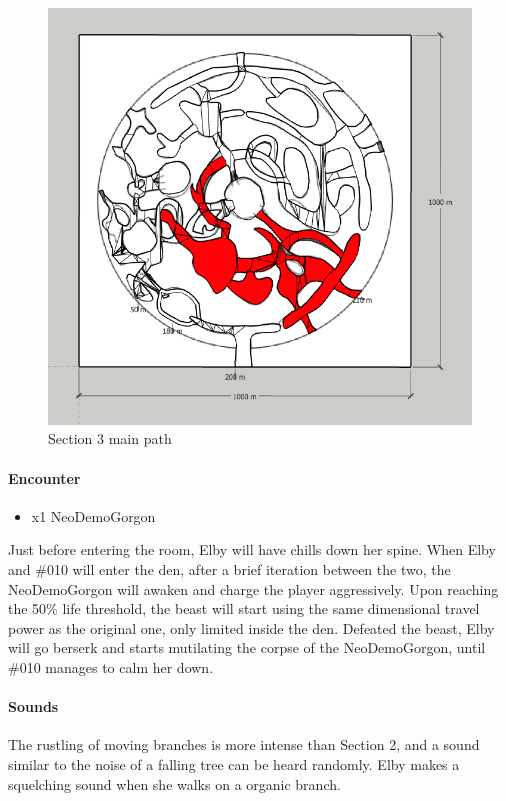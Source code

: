 \begin{figure}[H]
	\centering
	\includegraphics[width=0.8\linewidth]{images/map/2D_map_section_03.png}
	\caption*{Section 3 main path}
\end{figure}

\paragraph{Encounter}
\begin{itemize}
	\item x1 NeoDemoGorgon
\end{itemize}

Just before entering the room, Elby will have chills down her spine. When Elby and \#010 will enter the den, after a brief iteration between the two, the NeoDemoGorgon will awaken and charge the player aggressively. Upon reaching the 50\% life threshold, the beast will start using the same dimensional travel power as the original one, only limited inside the den. Defeated the beast, Elby will go berserk and starts mutilating the corpse of the NeoDemoGorgon, until \#010 manages to calm her down.

\paragraph{Sounds}
The rustling of moving branches is more intense than Section 2, and a sound similar to the noise of a falling tree can be heard randomly. Elby makes a squelching sound when she walks on a organic branch.

